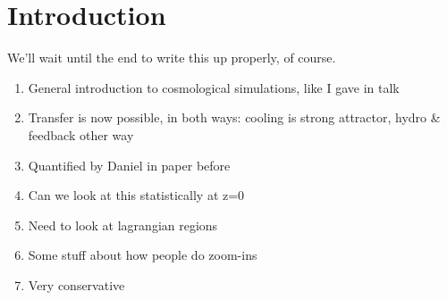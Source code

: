 \section{Introduction}

We'll wait until the end to write this up properly, of course.
\begin{enumerate}
    \item General introduction to cosmological simulations, like I gave in talk
    \item Transfer is now possible, in both ways: cooling is strong attractor, hydro \& feedback other way
    \item Quantified by Daniel in paper before
    \item Can we look at this statistically at z=0
    \item Need to look at lagrangian regions
    \item Some stuff about how people do zoom-ins
    \item Very conservative
\end{enumerate}